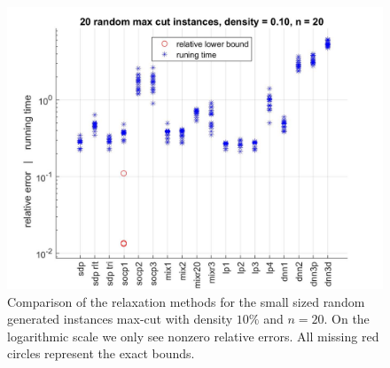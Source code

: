 \documentclass[12pt]{book}
\theoremstyle{definition}
\begin{document}
\begin{figure}
\centering
\includegraphics[scale = 0.27]{img/comp0_d10_n20.jpg}
\caption[Comparison of relaxations - small, sparse instances of max-cut]{Comparison of the relaxation methods for the small sized random generated instances max-cut with density $10\%$ and $n=20$. On the logarithmic scale we only see nonzero relative errors. All missing red circles represent the exact bounds.}
\label{comp0_d10_n20}
\end{figure}
\end{document}
